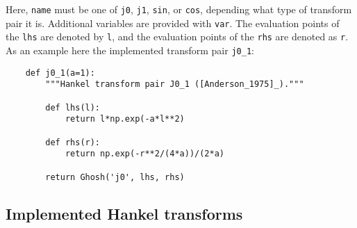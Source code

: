 \documentclass[fontsize=9pt, parskip=half, notitlepage, fleqn]{scrartcl}
\begin{document}
Here, \texttt{name} must be one of \texttt{j0}, \texttt{j1}, \texttt{sin}, or
\texttt{cos}, depending what type of transform pair it is. Additional variables
are provided with \texttt{var}. The evaluation points of the \texttt{lhs} are
denoted by \texttt{l}, and the evaluation points of the \texttt{rhs} are
denoted as \texttt{r}. As an example here the implemented transform pair
\texttt{j0\_1}:
\begin{verbatim}
    def j0_1(a=1):
        """Hankel transform pair J0_1 ([Anderson_1975]_)."""

        def lhs(l):
            return l*np.exp(-a*l**2)

        def rhs(r):
            return np.exp(-r**2/(4*a))/(2*a)

        return Ghosh('j0', lhs, rhs)
\end{verbatim}

\subsection{Implemented Hankel transforms}
\end{document}
